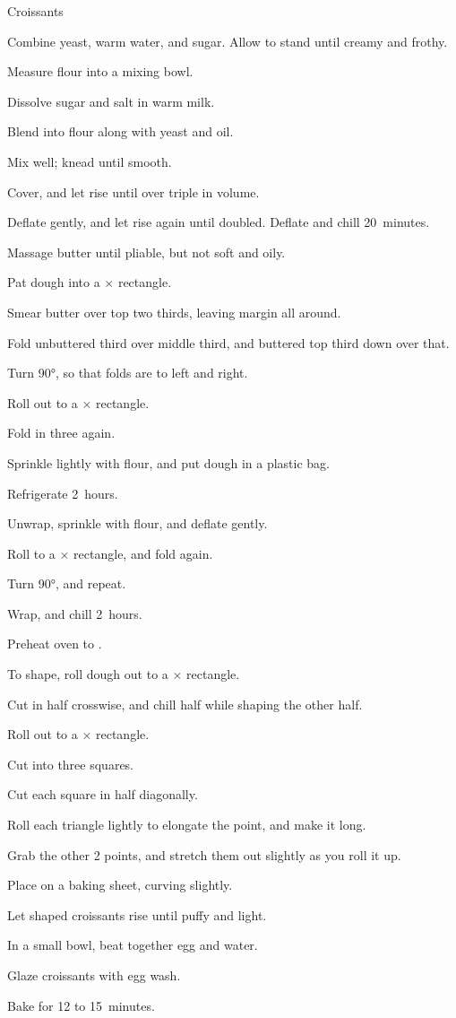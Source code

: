 \begin{recipe}{Croissants\UNTESTED}{}{}
\begin{directions}
\item Combine yeast, warm water, and  sugar. Allow to stand until creamy and frothy.
\item Measure flour into a mixing bowl.
\item Dissolve  sugar and salt in warm milk.
\item Blend into flour along with yeast and oil.
\item Mix well; knead until smooth.
\item Cover, and let rise until over triple in volume.
\item Deflate gently, and let rise again until doubled. Deflate and chill 20~minutes.
\item Massage butter until pliable, but not soft and oily.
\item Pat dough into a $\times$ rectangle.
\item Smear butter over top two thirds, leaving \cm{\half} margin all around.
\item Fold unbuttered third over middle third, and buttered top third down over that.
\item Turn \ang{90}, so that folds are to left and right.
\item Roll out to a $\times$ rectangle.
\item Fold in three again.
\item Sprinkle lightly with flour, and put dough in a plastic bag.
\item Refrigerate 2~hours.
\item Unwrap, sprinkle with flour, and deflate gently.
\item Roll to a $\times$ rectangle, and fold again.
\item Turn \ang{90}, and repeat.
\item Wrap, and chill 2~hours.
\item Preheat oven to .
\item To shape, roll dough out to a $\times$ rectangle.
\item Cut in half crosswise, and chill half while shaping the other half.
\item Roll out to a $\times$ rectangle.
\item Cut into three  squares.
\item Cut each square in half diagonally.
\item Roll each triangle lightly to elongate the point, and make it  long.
\item Grab the other 2 points, and stretch them out slightly as you roll it up.
\item Place on a baking sheet, curving slightly.
\item Let shaped croissants rise until puffy and light.
\item In a small bowl, beat together egg and  water.
\item Glaze croissants with egg wash.
\item Bake for 12 to 15~minutes.
\end{directions}
\end{recipe}
